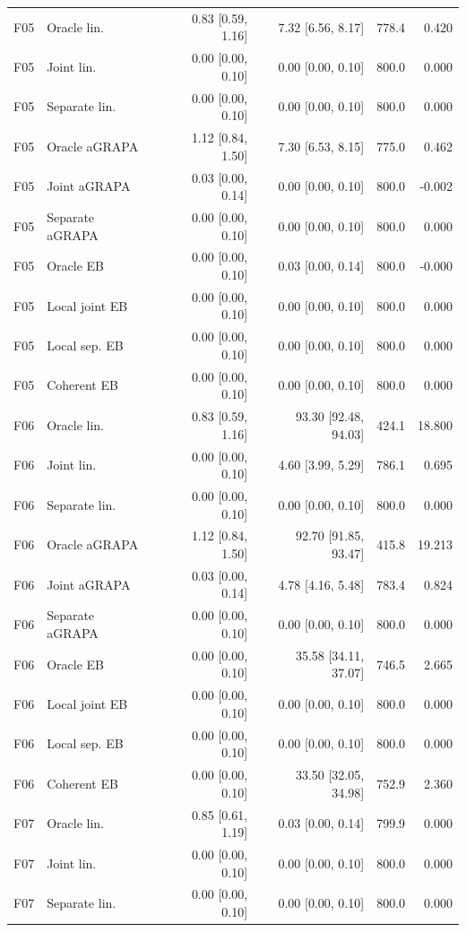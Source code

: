 \begin{longtable}{llrrrr}
F05 & Oracle lin. & 0.83 [0.59, 1.16] & 7.32 [6.56, 8.17] & 778.4 & 0.420\\
F05 & Joint lin. & 0.00 [0.00, 0.10] & 0.00 [0.00, 0.10] & 800.0 & 0.000\\
F05 & Separate lin. & 0.00 [0.00, 0.10] & 0.00 [0.00, 0.10] & 800.0 & 0.000\\
F05 & Oracle aGRAPA & 1.12 [0.84, 1.50] & 7.30 [6.53, 8.15] & 775.0 & 0.462\\
F05 & Joint aGRAPA & 0.03 [0.00, 0.14] & 0.00 [0.00, 0.10] & 800.0 & -0.002\\
F05 & Separate aGRAPA & 0.00 [0.00, 0.10] & 0.00 [0.00, 0.10] & 800.0 & 0.000\\
F05 & Oracle EB & 0.00 [0.00, 0.10] & 0.03 [0.00, 0.14] & 800.0 & -0.000\\
F05 & Local joint EB & 0.00 [0.00, 0.10] & 0.00 [0.00, 0.10] & 800.0 & 0.000\\
F05 & Local sep. EB & 0.00 [0.00, 0.10] & 0.00 [0.00, 0.10] & 800.0 & 0.000\\
F05 & Coherent EB & 0.00 [0.00, 0.10] & 0.00 [0.00, 0.10] & 800.0 & 0.000\\
F06 & Oracle lin. & 0.83 [0.59, 1.16] & 93.30 [92.48, 94.03] & 424.1 & 18.800\\
F06 & Joint lin. & 0.00 [0.00, 0.10] & 4.60 [3.99, 5.29] & 786.1 & 0.695\\
F06 & Separate lin. & 0.00 [0.00, 0.10] & 0.00 [0.00, 0.10] & 800.0 & 0.000\\
F06 & Oracle aGRAPA & 1.12 [0.84, 1.50] & 92.70 [91.85, 93.47] & 415.8 & 19.213\\
F06 & Joint aGRAPA & 0.03 [0.00, 0.14] & 4.78 [4.16, 5.48] & 783.4 & 0.824\\
F06 & Separate aGRAPA & 0.00 [0.00, 0.10] & 0.00 [0.00, 0.10] & 800.0 & 0.000\\
F06 & Oracle EB & 0.00 [0.00, 0.10] & 35.58 [34.11, 37.07] & 746.5 & 2.665\\
F06 & Local joint EB & 0.00 [0.00, 0.10] & 0.00 [0.00, 0.10] & 800.0 & 0.000\\
F06 & Local sep. EB & 0.00 [0.00, 0.10] & 0.00 [0.00, 0.10] & 800.0 & 0.000\\
F06 & Coherent EB & 0.00 [0.00, 0.10] & 33.50 [32.05, 34.98] & 752.9 & 2.360\\
F07 & Oracle lin. & 0.85 [0.61, 1.19] & 0.03 [0.00, 0.14] & 799.9 & 0.000\\
F07 & Joint lin. & 0.00 [0.00, 0.10] & 0.00 [0.00, 0.10] & 800.0 & 0.000\\
F07 & Separate lin. & 0.00 [0.00, 0.10] & 0.00 [0.00, 0.10] & 800.0 & 0.000\\

\end{longtable}
